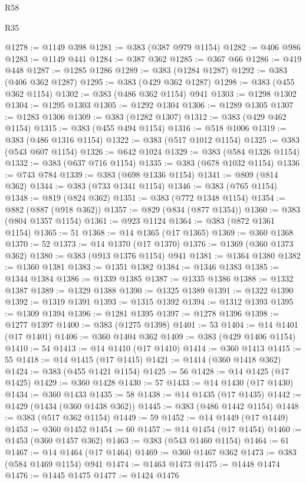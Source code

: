 \begin{lexlean}{R58}
\begin{lexlean}{R35}
\begin{coremodule}
{{{{{{{{{{{{{{{{{{{{{{{{{{{{{{{{{{{{{{{{{{{{{{{{{{{{@1278 := @1149 @398
@1281 := @383 (@387 @979 @1154)
@1282 := @406 @986
@1283 := @1149 @441
@1284 := @387 @362
@1285 := @367 @66
@1286 := @419 @448
@1287 := @1285 @1286
@1289 := @383 (@1284 @1287)
@1292 := @383 (@406 @362 @1287)
@1295 := @383 (@429 @362 @1287)
@1298 := @383 (@455 @362 @1154)
@1302 := @383 (@486 @362 @1154) @941
@1303 := @1298 @1302
@1304 := @1295 @1303
@1305 := @1292 @1304
@1306 := @1289 @1305
@1307 := @1283 @1306
@1309 := @383 (@1282 @1307)
@1312 := @383 (@429 @462 @1154)
@1315 := @383 (@455 @494 @1154)
@1316 := @518 @1006
@1319 := @383 (@486 @1316 @1154)
@1322 := @383 (@517 @1012 @1154)
@1325 := @383 (@543 @607 @1154)
@1326 := @642 @1024
@1329 := @383 (@584 @1326 @1154)
@1332 := @383 (@637 @716 @1154)
@1335 := @383 (@678 @1032 @1154)
@1336 := @743 @784
@1339 := @383 (@698 @1336 @1154)
@1341 := @809 (@814 @362)
@1344 := @383 (@733 @1341 @1154)
@1346 := @383 (@765 @1154)
@1348 := @819 (@824 @362)
@1351 := @383 (@772 @1348 @1154)
@1354 := @882 (@887 (@918 @362))
@1357 := @829 (@834 (@877 @1354))
@1360 := @383 (@804 @1357 @1154)
@1361 := @923 @1124
@1364 := @383 (@872 @1361 @1154)
@1365 := 51
@1368 := @14 @1365 (@17 @1365)
@1369 := @360 @1368
@1370 := 52
@1373 := @14 @1370 (@17 @1370)
@1376 := @1369 (@360 @1373 @362)
@1380 := @383 (@913 @1376 @1154) @941
@1381 := @1364 @1380
@1382 := @1360 @1381
@1383 := @1351 @1382
@1384 := @1346 @1383
@1385 := @1344 @1384
@1386 := @1339 @1385
@1387 := @1335 @1386
@1388 := @1332 @1387
@1389 := @1329 @1388
@1390 := @1325 @1389
@1391 := @1322 @1390
@1392 := @1319 @1391
@1393 := @1315 @1392
@1394 := @1312 @1393
@1395 := @1309 @1394
@1396 := @1281 @1395
@1397 := @1278 @1396
@1398 := @1277 @1397
@1400 := @383 (@1275 @1398)
@1401 := 53
@1404 := @14 @1401 (@17 @1401)
@1406 := @360 @1404 @362
@1409 := @383 (@429 @1406 @1154)
@1410 := 54
@1413 := @14 @1410 (@17 @1410)
@1414 := @360 @1413
@1415 := 55
@1418 := @14 @1415 (@17 @1415)
@1421 := @1414 (@360 @1418 @362)
@1424 := @383 (@455 @1421 @1154)
@1425 := 56
@1428 := @14 @1425 (@17 @1425)
@1429 := @360 @1428
@1430 := 57
@1433 := @14 @1430 (@17 @1430)
@1434 := @360 @1433
@1435 := 58
@1438 := @14 @1435 (@17 @1435)
@1442 := @1429 (@1434 (@360 @1438 @362))
@1445 := @383 (@486 @1442 @1154)
@1448 := @383 (@517 @362 @1154)
@1449 := 59
@1452 := @14 @1449 (@17 @1449)
@1453 := @360 @1452
@1454 := 60
@1457 := @14 @1454 (@17 @1454)
@1460 := @1453 (@360 @1457 @362)
@1463 := @383 (@543 @1460 @1154)
@1464 := 61
@1467 := @14 @1464 (@17 @1464)
@1469 := @360 @1467 @362
@1473 := @383 (@584 @1469 @1154) @941
@1474 := @1463 @1473
@1475 := @1448 @1474
@1476 := @1445 @1475
@1477 := @1424 @1476
}}}}}}}}}}}}}}}}}}}}}}}}}}}}}}}}}}}}}}}}}}}}}}}}}}}}
\end{coremodule}
\end{lexlean}
\end{lexlean}
